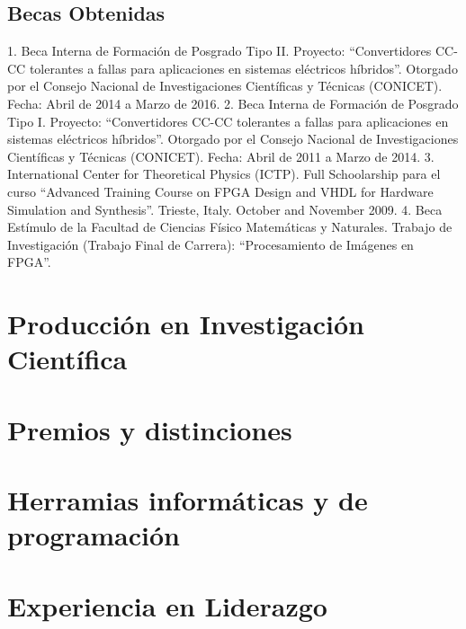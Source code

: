 \documentclass[11pt,a4paper,sans]{moderncv} %
\begin{document}
\subsection{Becas Obtenidas}
1. Beca Interna de Formación de Posgrado Tipo II. Proyecto: “Convertidores CC-CC tolerantes a fallas para aplicaciones en sistemas eléctricos híbridos”. Otorgado por el Consejo Nacional de Investigaciones Científicas y Técnicas (CONICET). Fecha: Abril de 2014 a Marzo de 2016. 
2. Beca Interna de Formación de Posgrado Tipo I. Proyecto: “Convertidores CC-CC tolerantes a fallas para aplicaciones en sistemas eléctricos híbridos”. Otorgado por el Consejo Nacional de Investigaciones Científicas y Técnicas (CONICET). Fecha: Abril de 2011 a Marzo de 2014. 
3. International Center for Theoretical Physics (ICTP). Full Schoolarship para el curso “Advanced Training Course on FPGA Design and VHDL for Hardware Simulation and Synthesis”. Trieste, Italy. October and November 2009. 
4. Beca Estímulo de la Facultad de Ciencias Físico Matemáticas y Naturales. Trabajo de Investigación (Trabajo Final de Carrera): “Procesamiento de Imágenes en FPGA”.

\section{Producción en Investigación Científica}

\section{Premios y distinciones}



\section{Herramias informáticas y de programación}



\section{Experiencia en Liderazgo}
\end{document}
